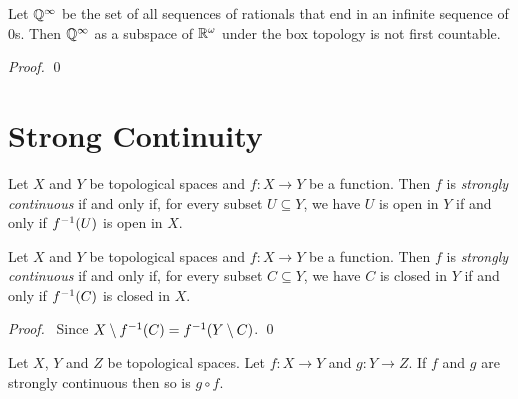 \begin{example}[Choice]
    Let $\mathbb{Q}^\infty$ be the set of all sequences of rationals that end in an
    infinite sequence of 0s. Then $\mathbb{Q}^\infty$ as a subspace of $\mathbb{R}^\omega$
    under the box topology is not first countable.

    \begin{proof}
        \pf
        \qed
    \end{proof}
\end{example}

\section{Strong Continuity}

\begin{definition}
    Let $X$ and $Y$ be topological spaces and $f : X \rightarrow Y$ be a function. Then $f$ is \emph{strongly continuous} if and only if, for every subset $U \subseteq Y$,
    we have $U$ is open in $Y$ if and only if ${f}^{-1}(U)$ is open in $X$.
\end{definition}

\begin{proposition}
    Let $X$ and $Y$ be topological spaces and $f : X \rightarrow Y$ be a function. Then $f$ is \emph{strongly continuous} if and only if, for every subset $C \subseteq Y$,
    we have $C$ is closed in $Y$ if and only if ${f}^{-1}(C)$ is closed in $X$.
\end{proposition}

\begin{proof}
    \pf\ Since $X \setminus {f}^{-1}(C) = {f}^{-1}(Y \setminus C)$. \qed
\end{proof}

\begin{proposition}
    \label{proposition:strongly_continuous_composite}
    Let $X$, $Y$ and $Z$ be topological spaces. Let $f : X \rightarrow Y$ and $g : Y \rightarrow Z$. If $f$ and $g$ are strongly continuous then so is $g \circ f$.
\end{proposition}

